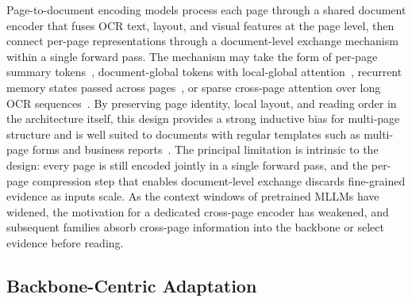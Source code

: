 \documentclass[11pt]{article}
\begin{document}
Page-to-document encoding models process each page through a shared document encoder that fuses OCR text, layout, and visual features at the page level, then connect per-page representations through a document-level exchange mechanism within a single forward pass. The mechanism may take the form of per-page summary tokens~\cite{tito2023hierarchical}, document-global tokens with local-global attention~\cite{blau2024gram}, recurrent memory states passed across pages~\cite{dong2024multipage}, or sparse cross-page attention over long OCR sequences~\cite{borchmann2025arctictilt}. By preserving page identity, local layout, and reading order in the architecture itself, this design provides a strong inductive bias for multi-page structure and is well suited to documents with regular templates such as multi-page forms and business reports~\cite{tito2023hierarchical,borchmann2025arctictilt}. The principal limitation is intrinsic to the design: every page is still encoded jointly in a single forward pass, and the per-page compression step that enables document-level exchange discards fine-grained evidence as inputs scale. As the context windows of pretrained MLLMs have widened, the motivation for a dedicated cross-page encoder has weakened, and subsequent families absorb cross-page information into the backbone or select evidence before reading.

\subsection{Backbone-Centric Adaptation}
\label{sec:arch-bc}
\end{document}
